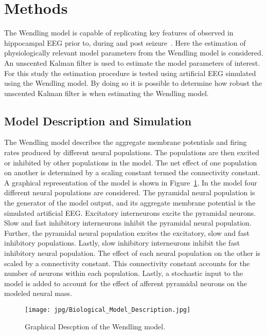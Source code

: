 \section{Methods}

The Wendling model is capable of replicating key features of observed in hippocampal EEG prior to, during and post seizure~\citep{wendling2002epileptic}. Here the estimation of physiologically relevant model parameters from the Wendling model is considered. An unscented Kalman filter is used to estimate the model parameters of interest. For this study the estimation procedure is tested using artificial EEG simulated using the Wendling model. By doing so it is possible to determine how robust the unscented Kalman filter is when estimating the Wendling model.

\subsection{Model Description and Simulation}


The Wendling model describes the aggregate membrane potentials and firing rates produced by different neural populations. The populations are then excited or inhibited by other populations in the model. The net effect of one population on another is determined by a scaling constant termed the connectivity constant. A graphical representation of the model is shown in Figure~\ref{fig: Biological}. In the model four different neural populations are considered. The pyramidal neural population is the generator of the model output, and its aggregate membrane potential is the simulated artificial EEG. Excitatory interneurons excite the pyramidal neurons. Slow and fast inhibitory interneurons inhibit the pyramidal neural population. Further, the pyramidal neural population excites the excitatory, slow and fast inhibitory populations. Lastly, slow inhibitory interneurons inhibit the fast inhibitory neural population. The effect of each neural population on the other is scaled by a connectivity constant. This connectivity constant accounts for the number of neurons within each population.  Lastly, a stochastic input to the model is added to account for the effect of afferent pyramidal neurons on the modeled neural mass.
\begin{figure}  %
	\centering
		\texttt{[image: jpg/Biological\_Model\_Description.jpg]}
	\caption{Graphical Descption of the Wendling model.}
	\label{fig: Biological}
\end{figure}

